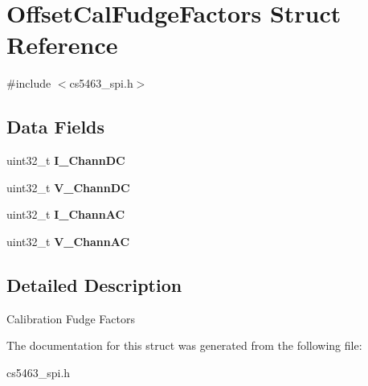 \hypertarget{structOffsetCalFudgeFactors}{\section{Offset\-Cal\-Fudge\-Factors Struct Reference}
\label{structOffsetCalFudgeFactors}
}


{\ttfamily \#include $<$cs5463\-\_\-spi.\-h$>$}

\subsection*{Data Fields}
\begin{DoxyCompactItemize}
\item 
\hypertarget{structOffsetCalFudgeFactors_acf80472e38e8cee826fe02c8ebc60568}{uint32\-\_\-t {\bfseries I\-\_\-\-Chann\-D\-C}}\label{structOffsetCalFudgeFactors_acf80472e38e8cee826fe02c8ebc60568}

\item 
\hypertarget{structOffsetCalFudgeFactors_aaa824df31305cc4d7df3e31ff387f340}{uint32\-\_\-t {\bfseries V\-\_\-\-Chann\-D\-C}}\label{structOffsetCalFudgeFactors_aaa824df31305cc4d7df3e31ff387f340}

\item 
\hypertarget{structOffsetCalFudgeFactors_a333a54d7625f6e637b2af06ab64b43df}{uint32\-\_\-t {\bfseries I\-\_\-\-Chann\-A\-C}}\label{structOffsetCalFudgeFactors_a333a54d7625f6e637b2af06ab64b43df}

\item 
\hypertarget{structOffsetCalFudgeFactors_a588663e6501b10c1b0fa4a9b7610f89c}{uint32\-\_\-t {\bfseries V\-\_\-\-Chann\-A\-C}}\label{structOffsetCalFudgeFactors_a588663e6501b10c1b0fa4a9b7610f89c}

\end{DoxyCompactItemize}


\subsection{Detailed Description}
Calibration Fudge Factors 

The documentation for this struct was generated from the following file\-:\begin{DoxyCompactItemize}
\item 
cs5463\-\_\-spi.\-h\end{DoxyCompactItemize}
